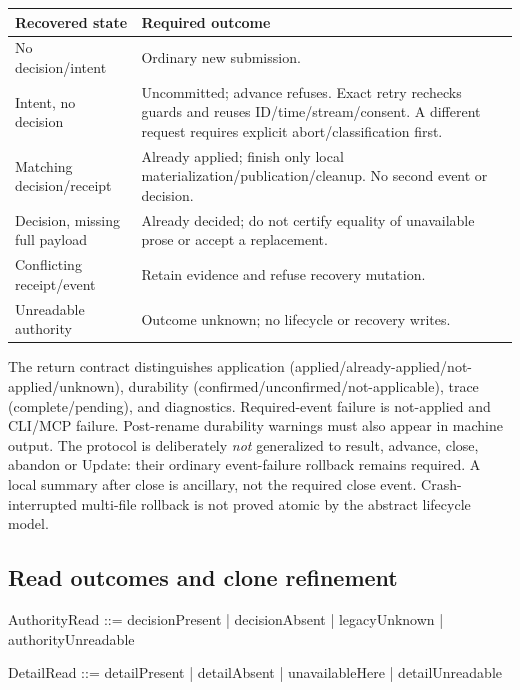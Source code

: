 \documentclass[a4paper,10pt,fleqn]{article}
\begin{document}
\begin{longtable}{@{}>{\raggedright\arraybackslash}p{}>{\raggedright\arraybackslash}p{}@{}}
\toprule
Recovered state & Required outcome \\
\midrule
\endhead
\bottomrule
\endfoot
No decision/intent & Ordinary new submission. \\
Intent, no decision & Uncommitted; advance refuses. Exact retry rechecks
guards and reuses ID/time/stream/consent. A different request requires
explicit abort/classification first. \\
Matching decision/receipt & Already applied; finish only local
materialization/publication/cleanup. No second event or decision. \\
Decision, missing full payload & Already decided; do not certify
equality of unavailable prose or accept a replacement. \\
Conflicting receipt/event & Retain evidence and refuse recovery mutation. \\
Unreadable authority & Outcome unknown; no lifecycle or recovery writes. \\
\end{longtable}

The return contract distinguishes application
(applied/already-applied/not-applied/unknown), durability
(confirmed/unconfirmed/not-applicable), trace (complete/pending), and
diagnostics. Required-event failure is not-applied and CLI/MCP failure.
Post-rename durability warnings must also appear in machine output.
The protocol is deliberately \emph{not} generalized to result,
advance, close, abandon or Update: their ordinary event-failure
rollback remains required. A local summary after close is ancillary,
not the required close event. Crash-interrupted multi-file rollback
is not proved atomic by the abstract lifecycle model.

\subsection{Read outcomes and clone refinement}

\begin{zed}
AuthorityRead ::= decisionPresent | decisionAbsent
                | legacyUnknown | authorityUnreadable
\end{zed}
\begin{zed}
DetailRead ::= detailPresent | detailAbsent
             | unavailableHere | detailUnreadable
\end{zed}
\end{document}
